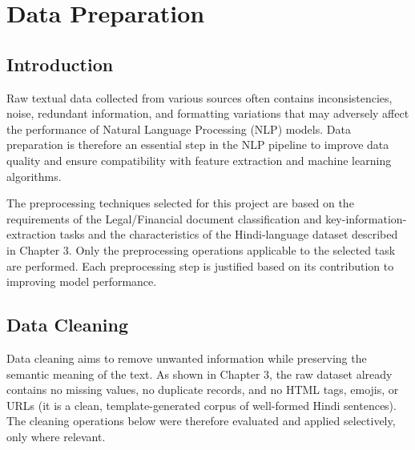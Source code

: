 
\chapter{Data Preparation}

\section{Introduction}

Raw textual data collected from various sources often contains inconsistencies, noise, redundant information, and formatting variations that may adversely affect the performance of Natural Language Processing (NLP) models. Data preparation is therefore an essential step in the NLP pipeline to improve data quality and ensure compatibility with feature extraction and machine learning algorithms.

The preprocessing techniques selected for this project are based on the requirements of the Legal/Financial document classification and key-information-extraction tasks and the characteristics of the Hindi-language dataset described in Chapter 3. Only the preprocessing operations applicable to the selected task are performed. Each preprocessing step is justified based on its contribution to improving model performance.


\section{Data Cleaning}

Data cleaning aims to remove unwanted information while preserving the semantic meaning of the text. As shown in Chapter 3, the raw dataset already contains no missing values, no duplicate records, and no HTML tags, emojis, or URLs (it is a clean, template-generated corpus of well-formed Hindi sentences). The cleaning operations below were therefore evaluated and applied selectively, only where relevant.

\newpage
\renewcommand{\arraystretch}{1.5}

